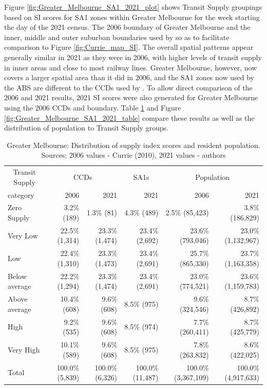 \documentclass[preprint, 3p,
authoryear]{elsarticle} %
\begin{document}
Figure \ref{fig:Greater_Melbourne_SA1_2021_plot} shows Transit Supply
groupings based on SI scores for SA1 zones within Greater Melbourne for
the week starting the day of the 2021 census. The 2006 boundary of
Greater Melbourne and the inner, middle and outer suburban boundaries
used by \citet{currie2010identifying} so as to facilitate comparison to
Figure \ref{fig:Currie_map_SI}. The overall spatial patterns appear
generally similar in 2021 as they were in 2006, with higher levels of
transit supply in inner areas and close to most railway lines. Greater
Melbourne, however, now covers a larger spatial area than it did in
2006, and the SA1 zones now used by the ABS are different to the CCDs
used by \citet{currie2010identifying}. To allow direct comparison of the
2006 and 2021 results, 2021 SI scores were also generated for Greater
Melbourne using the 2006 CCDs and boundary. Table
\ref{tab:Greater_Melbourne_SA1_2021_table} and Figure
\ref{fig:Greater_Melbourne_SA1_2021_table} compare these results as well
as the distribution of population to Transit Supply groups.

\begin{table}

\caption{\label{tab:Greater_Melbourne_SA1_2021_table}Greater Melbourne: Distribution of supply index scores and resident population. Sources: 2006 values - Currie (2010), 2021 values - authors}
\centering
\begin{tabular}[t]{l|r|r|r|r|r}
\hline
\multicolumn{1}{c|}{Transit Supply} & \multicolumn{2}{c|}{CCDs} & \multicolumn{1}{c|}{SA1s} & \multicolumn{2}{c}{Population} \\
\cline{1-1} \cline{2-3} \cline{4-4} \cline{5-6}
category & 2006 & 2021 & 2021 & 2006 & 2021\\
\hline
Zero Supply & 3.2\%   (189) & 1.3\%    (81) & 4.3\%    (489) & 2.5\%    (85,423) & 3.8\%   (186,829)\\
\hline
Very Low & 22.5\% (1,314) & 23.3\% (1,474) & 23.4\%  (2,692) & 23.6\%   (793,046) & 23.0\% (1,132,967)\\
\hline
Low & 22.4\% (1,310) & 23.3\% (1,473) & 23.4\%  (2,691) & 25.7\%   (865,330) & 23.7\% (1,163,358)\\
\hline
Below average & 22.2\% (1,294) & 23.3\% (1,474) & 23.4\%  (2,691) & 23.0\%   (774,521) & 23.6\% (1,159,783)\\
\hline
Above average & 10.4\%   (608) & 9.6\%   (608) & 8.5\%    (975) & 9.6\%   (324,546) & 8.7\%   (426,892)\\
\hline
High & 9.2\%   (535) & 9.6\%   (608) & 8.5\%    (974) & 7.7\%   (260,411) & 8.7\%   (425,779)\\
\hline
Very High & 10.1\%   (589) & 9.6\%   (608) & 8.5\%    (975) & 7.8\%   (263,832) & 8.6\%   (422,025)\\
\hline
Total & 100.0\% (5,839) & 100.0\% (6,326) & 100.0\% (11,487) & 100.0\% (3,367,109) & 100.0\% (4,917,633)\\
\hline
\end{tabular}
\end{table}
\end{document}

